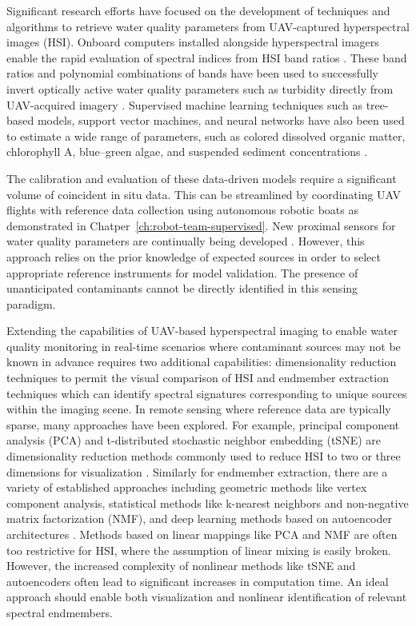 Significant research efforts have focused on the development of techniques and
algorithms to retrieve water quality parameters from UAV-captured hyperspectral
images (HSI). Onboard computers installed alongside hyperspectral imagers enable
the rapid evaluation of spectral indices from HSI band ratios
\cite{horstrand2019uav}. These band ratios and polynomial combinations of bands
have been used to successfully invert optically active water quality parameters
such as turbidity directly from UAV-acquired imagery \cite{vogt2016near,
  zhang2022selection}. Supervised machine learning techniques such as tree-based
models, support vector machines, and neural networks have also been used to
estimate a wide range of parameters, such as colored dissolved organic matter,
chlorophyll A, blue--green algae, and suspended sediment concentrations
\cite{keller2018hyperspectral, lu2021retrieval}.

The calibration and evaluation of these data-driven models require a significant
volume of coincident in situ data. This can be streamlined by coordinating UAV
flights with reference data collection using autonomous robotic boats as
demonstrated in Chatper~\ref{ch:robot-team-supervised}.
New proximal sensors for water quality parameters are continually being
developed \cite{proximal-sensing-1, proximal-sensing-2}. However, this approach
relies on the prior knowledge of expected sources in order to select appropriate
reference instruments for model validation. The presence of unanticipated
contaminants cannot be directly identified in this sensing paradigm.

Extending the capabilities of UAV-based hyperspectral imaging to enable water
quality monitoring in real-time scenarios where contaminant sources may not be
known in advance requires two additional capabilities: dimensionality reduction
techniques to permit the visual comparison of HSI and endmember extraction
techniques which can identify spectral signatures corresponding to unique
sources within the imaging scene. In remote sensing where reference data are
typically sparse, many approaches have been explored. For example, principal
component analysis (PCA) and t-distributed stochastic neighbor embedding (tSNE)
are dimensionality reduction methods commonly used to reduce HSI to two or three
dimensions for visualization \cite{tyo2003principal,zhang2015hyperspectral}.
Similarly for endmember extraction, there are a variety of established
approaches including geometric methods like vertex component analysis,
statistical methods like k-nearest neighbors and non-negative matrix
factorization (NMF), and deep learning methods based on autoencoder
architectures \cite{heylen2014review,vca-orig, unmixing-nmf-review-2,
  cariou2015unsupervised, su2019daen, borsoi2019deep, palsson2020convolutional}.
Methods based on linear mappings like PCA and NMF are often too restrictive for
HSI, where the assumption of linear mixing is easily broken. However, the
increased complexity of nonlinear methods like tSNE and autoencoders often lead
to significant increases in computation time. An ideal approach should enable
both visualization and nonlinear identification of relevant spectral endmembers.

